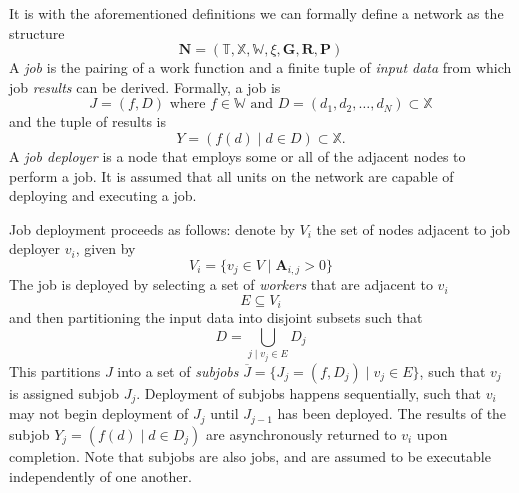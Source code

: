 \documentclass[../mthe-493-project-proposal.tex]{subfiles}
\begin{document}
    It is with the aforementioned definitions we can formally define a network as the structure
    \begin{equation}
        \label{eq:network}
        \mathbf{N} = (\mathbb{T}, \mathbb{X}, \mathbb{W}, \xi, \mathbf{G}, \mathbf{R}, \mathbf{P})
    \end{equation}
    A \textit{job} is the pairing of a work function and a finite tuple of \textit{input data} from which job \textit{results} can be derived. Formally, a job is
    \begin{equation*}
        J = (f, D) \text{ where } f \in \mathbb{W} \text{ and } D = (d_1, d_2, \dotsc, d_N) \subset \mathbb{X}
    \end{equation*}
    and the tuple of results is
    \begin{equation*}
        Y = (f(d) \mid d \in D) \subset \mathbb{X}.
    \end{equation*}
    A \textit{job deployer} is a node that employs some or all of the adjacent nodes to perform a job. It is assumed that all units on the network are capable of deploying and executing a job.

    Job deployment proceeds as follows: denote by $V_i$ the set of nodes adjacent to job deployer $v_i$, given by
    \begin{equation}
        \label{eq:adjacent-nodes}
        V_i = \{v_j \in V \mid \mathbf{A}_{i,j} > 0\}
    \end{equation}
    The job is deployed by selecting a set of \textit{workers} that are adjacent to $v_i$
    \begin{equation}
        \label{eq:workers}
        E \subseteq V_i
    \end{equation}
    and then partitioning the input data into disjoint subsets such that
    \begin{equation}
        \label{eq:subjob-partition}
        D = \bigcup\limits_{j \mid v_j \in E} D_j
    \end{equation}
    This partitions $J$ into a set of \textit{subjobs} $\overline{J} = \{J_j = (f, D_j) \mid v_j \in E\}$, such that $v_j$ is assigned subjob $J_j$. Deployment of subjobs happens sequentially, such that $v_i$ may not begin deployment of $J_j$ until $J_{j-1}$ has been deployed. The results of the subjob $Y_j = (f(d) \mid d \in D_j)$ are asynchronously returned to $v_i$ upon completion. Note that subjobs are also jobs, and are assumed to be executable independently of one another.
\end{document}
